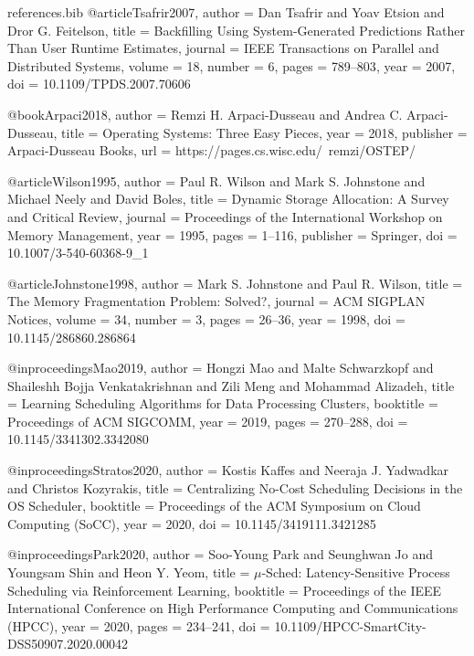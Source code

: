 \begin{filecontents*}{references.bib}
@article{Tsafrir2007,
  author    = {Dan Tsafrir and Yoav Etsion and Dror G. Feitelson},
  title     = {Backfilling Using System-Generated Predictions Rather Than User Runtime Estimates},
  journal   = {IEEE Transactions on Parallel and Distributed Systems},
  volume    = {18},
  number    = {6},
  pages     = {789--803},
  year      = {2007},
  doi       = {10.1109/TPDS.2007.70606}
}

@book{Arpaci2018,
  author    = {Remzi H. Arpaci-Dusseau and Andrea C. Arpaci-Dusseau},
  title     = {Operating Systems: Three Easy Pieces},
  year      = {2018},
  publisher = {Arpaci-Dusseau Books},
  url       = {https://pages.cs.wisc.edu/~remzi/OSTEP/}
}

@article{Wilson1995,
  author    = {Paul R. Wilson and Mark S. Johnstone and Michael Neely and David Boles},
  title     = {Dynamic Storage Allocation: A Survey and Critical Review},
  journal   = {Proceedings of the International Workshop on Memory Management},
  year      = {1995},
  pages     = {1--116},
  publisher = {Springer},
  doi       = {10.1007/3-540-60368-9_1}
}

@article{Johnstone1998,
  author    = {Mark S. Johnstone and Paul R. Wilson},
  title     = {The Memory Fragmentation Problem: Solved?},
  journal   = {ACM SIGPLAN Notices},
  volume    = {34},
  number    = {3},
  pages     = {26--36},
  year      = {1998},
  doi       = {10.1145/286860.286864}
}

@inproceedings{Mao2019,
  author    = {Hongzi Mao and Malte Schwarzkopf and Shaileshh Bojja Venkatakrishnan and Zili Meng and Mohammad Alizadeh},
  title     = {Learning Scheduling Algorithms for Data Processing Clusters},
  booktitle = {Proceedings of ACM SIGCOMM},
  year      = {2019},
  pages     = {270--288},
  doi       = {10.1145/3341302.3342080}
}


@inproceedings{Stratos2020,
  author    = {Kostis Kaffes and Neeraja J. Yadwadkar and Christos Kozyrakis},
  title     = {Centralizing No-Cost Scheduling Decisions in the OS Scheduler},
  booktitle = {Proceedings of the ACM Symposium on Cloud Computing (SoCC)},
  year      = {2020},
  doi       = {10.1145/3419111.3421285}
}

@inproceedings{Park2020,
  author    = {Soo-Young Park and Seunghwan Jo and Youngsam Shin and Heon Y. Yeom},
  title     = {$\mu$-Sched: Latency-Sensitive Process Scheduling via Reinforcement Learning},
  booktitle = {Proceedings of the IEEE International Conference on High Performance Computing and Communications (HPCC)},
  year      = {2020},
  pages     = {234--241},
  doi       = {10.1109/HPCC-SmartCity-DSS50907.2020.00042}
}


\end{filecontents*}

